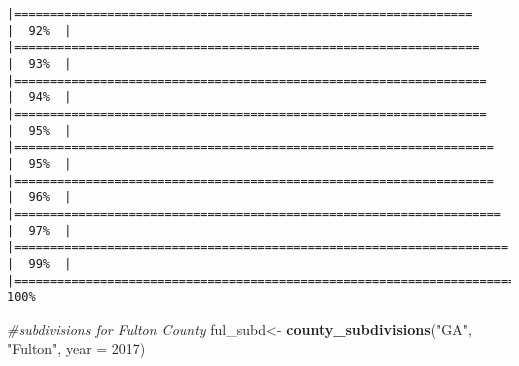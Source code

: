 \documentclass[
]{article}
\newenvironment{Shaded}{\begin{snugshade}}{\end{snugshade}}
\newcommand{\AttributeTok}[1]{\textcolor[rgb]{0.13,0.29,0.53}{#1}}
\newcommand{\CommentTok}[1]{\textcolor[rgb]{0.56,0.35,0.01}{\textit{#1}}}
\newcommand{\DecValTok}[1]{\textcolor[rgb]{0.00,0.00,0.81}{#1}}
\newcommand{\FunctionTok}[1]{\textcolor[rgb]{0.13,0.29,0.53}{\textbf{#1}}}
\newcommand{\NormalTok}[1]{#1}
\newcommand{\OtherTok}[1]{\textcolor[rgb]{0.56,0.35,0.01}{#1}}
\newcommand{\StringTok}[1]{\textcolor[rgb]{0.31,0.60,0.02}{#1}}
\begin{document}
\begin{verbatim}
|================================================================      |  92%  |                                                                              |=================================================================     |  93%  |                                                                              |==================================================================    |  94%  |                                                                              |==================================================================    |  95%  |                                                                              |===================================================================   |  95%  |                                                                              |===================================================================   |  96%  |                                                                              |====================================================================  |  97%  |                                                                              |===================================================================== |  99%  |                                                                              |======================================================================| 100%
\end{verbatim}

\begin{Shaded}
\begin{Highlighting}[]
\CommentTok{\#subdivisions for Fulton County}
\NormalTok{ful\_subd}\OtherTok{\textless{}{-}} \FunctionTok{county\_subdivisions}\NormalTok{(}\StringTok{"GA"}\NormalTok{, }\StringTok{"Fulton"}\NormalTok{, }\AttributeTok{year =} \DecValTok{2017}\NormalTok{)}
\end{Highlighting}
\end{Shaded}
\end{document}

